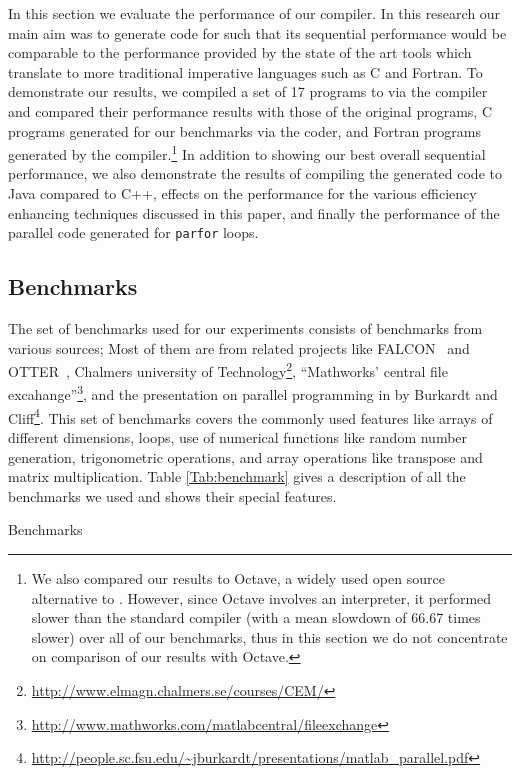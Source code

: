In this section we evaluate the performance of our compiler. In this research
our main aim was to generate \xten code for \matlab such that its sequential
performance would be comparable to the performance provided by the state of the
art tools which translate \matlab to more traditional imperative languages such
as C and Fortran.  To demonstrate our results, we compiled a set of 17 \matlab
programs to \xten via the \mixten compiler and compared their performance
results with those of the original \matlab programs, C programs generated for
our benchmarks via the \matlab coder, and Fortran programs generated by the
\mctwofor compiler.\footnote{We also compared our results to Octave, a widely
used open source alternative to \matlab. However, since Octave involves an
interpreter, it performed slower than the standard \matlab compiler (with a
mean slowdown of 66.67 times slower) over all of our benchmarks, thus in this
section we do not concentrate on comparison of our results with Octave.} In
addition to showing our best overall sequential performance,  we also
demonstrate the results of compiling the generated \xten code to Java compared
to C++, effects on the performance for the various efficiency enhancing
techniques discussed in this paper, and finally the performance of the parallel
\xten code generated for \matlab \texttt{parfor} loops.

\subsection{Benchmarks}

The set of benchmarks used for our experiments consists of benchmarks from
various sources; Most of them are from related projects like
FALCON~\cite{falcon} and OTTER~\cite{QMSZ98}, Chalmers university of
Technology\footnote{\url{http://www.elmagn.chalmers.se/courses/CEM/}}, ``Mathworks'
central file
excahange''\footnote{\url{http://www.mathworks.com/matlabcentral/fileexchange}}, and
the presentation on parallel programming in \matlab by Burkardt and
Cliff\footnote{\url{http://people.sc.fsu.edu/~jburkardt/presentations/matlab\_parallel.pdf}}.
This set of benchmarks covers the commonly used \matlab features like arrays of
different dimensions, loops, use of numerical functions like random number
generation, trigonometric operations, and array operations like transpose and
matrix multiplication. Table \ref{Tab:benchmark} gives a description of all the
benchmarks we used and shows their special features.  

\begin{table}
\begin{footnotesize}
 
\end{footnotesize}
\caption{Benchmarks} 
\label{Tab:benchmark}
\end{table}

